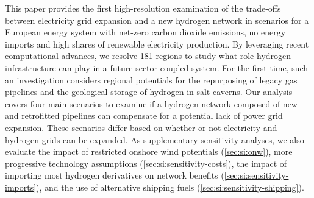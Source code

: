 This paper provides the first high-resolution examination of the trade-offs
between electricity grid expansion and a new hydrogen network in scenarios for a
European energy system with net-zero carbon dioxide emissions, no energy imports
and high shares of renewable electricity production. By leveraging recent
computational advances, we resolve 181 regions to study what role hydrogen
infrastructure can play in a future sector-coupled system. For the first time,
such an investigation considers regional potentials for the repurposing of
legacy gas pipelines and the geological storage of hydrogen in salt caverns. Our
analysis covers four main scenarios to examine if a hydrogen network composed of
new and retrofitted pipelines can compensate for a potential lack of power grid
expansion. These scenarios differ based on whether or not electricity and
hydrogen grids can be expanded. As supplementary sensitivity analyses, we also
evaluate the impact of restricted onshore wind potentials (\cref{sec:si:onw}),
more progressive technology assumptions
(\cref{sec:si:sensitivity-costs}), the impact of importing most hydrogen
derivatives on network benefits (\cref{sec:si:sensitivity-imports}), and the use
of alternative shipping fuels (\cref{sec:si:sensitivity-shipping}).

